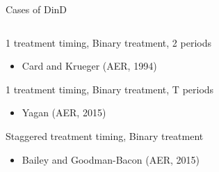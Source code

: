 \documentclass[notes,11pt, aspectratio=169]{beamer}
\newenvironment{wideitemize}{\itemize\addtolength{\itemsep}{10pt}}{\enditemize}
\begin{document}
\begin{frame}{Cases of DinD}
  \begin{columns}[T] %
    \begin{column}{.58\textwidth}
      \begin{wideitemize}
      \item 1 treatment timing, Binary treatment, 2 periods
        \begin{itemize}
        \item Card and Krueger  (AER, 1994)
        \end{itemize}
      \item 1 treatment timing, Binary treatment, T periods
        \begin{itemize}
        \item Yagan (AER, 2015) 
        \end{itemize}
      \item Staggered treatment timing, Binary treatment
        \begin{itemize}
          \item Bailey and Goodman-Bacon (AER, 2015)
        \end{itemize}
      \end{wideitemize}
    \end{column}%
    \hfill%
    \begin{column}{.38\textwidth}
    \end{column}%
  \end{columns}
\end{frame}
\end{document}
